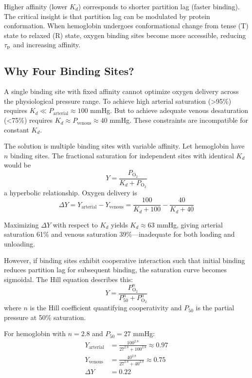 Higher affinity (lower $K_{d}$) corresponds to shorter partition lag (faster binding). The critical insight is that partition lag can be modulated by protein conformation. When hemoglobin undergoes conformational change from tense (T) state to relaxed (R) state, oxygen binding sites become more accessible, reducing $\tau_{\mathrm{p}}$ and increasing affinity.

\subsection{Why Four Binding Sites?}

A single binding site with fixed affinity cannot optimize oxygen delivery across the physiological pressure range. To achieve high arterial saturation (>95\%) requires $K_{d} \ll P_{\mathrm{arterial}} \approx 100$ mmHg. But to achieve adequate venous desaturation (<75\%) requires $K_{d} \approx P_{\mathrm{venous}} \approx 40$ mmHg. These constraints are incompatible for constant $K_{d}$.

The solution is multiple binding sites with variable affinity. Let hemoglobin have $n$ binding sites. The fractional saturation for independent sites with identical $K_{d}$ would be
\begin{equation}
Y = \frac{P_{\mathrm{O}_{2}}}{K_{d} + P_{\mathrm{O}_{2}}}
\end{equation}
a hyperbolic relationship. Oxygen delivery is
\begin{equation}
\Delta Y = Y_{\mathrm{arterial}} - Y_{\mathrm{venous}} = \frac{100}{K_{d} + 100} - \frac{40}{K_{d} + 40}
\end{equation}

Maximizing $\Delta Y$ with respect to $K_{d}$ yields $K_{d} \approx 63$ mmHg, giving arterial saturation 61\% and venous saturation 39\%—inadequate for both loading and unloading.

However, if binding sites exhibit cooperative interaction such that initial binding reduces partition lag for subsequent binding, the saturation curve becomes sigmoidal. The Hill equation describes this:
\begin{equation}
Y = \frac{P_{\mathrm{O}_{2}}^{n}}{P_{50}^{n} + P_{\mathrm{O}_{2}}^{n}}
\label{eq:hill}
\end{equation}
where $n$ is the Hill coefficient quantifying cooperativity and $P_{50}$ is the partial pressure at 50\% saturation.

For hemoglobin with $n = 2.8$ and $P_{50} = 27$ mmHg:
\begin{align}
Y_{\mathrm{arterial}} &= \frac{100^{2.8}}{27^{2.8} + 100^{2.8}} \approx 0.97 \\
Y_{\mathrm{venous}} &= \frac{40^{2.8}}{27^{2.8} + 40^{2.8}} \approx 0.75 \\
\Delta Y &= 0.22
\end{align}

